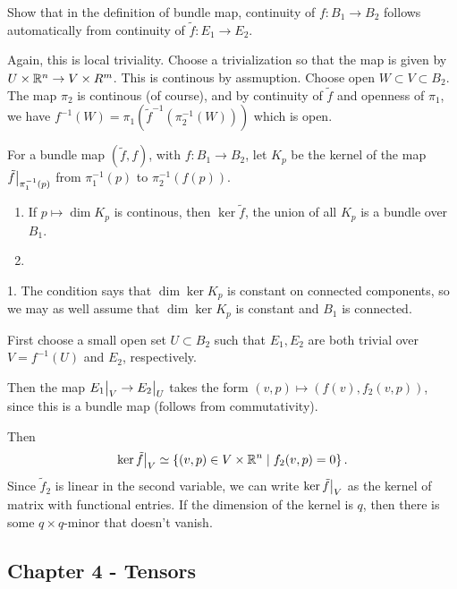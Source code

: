 \documentclass[11pt, english]{article}
\begin{document}
\begin{exc}
Show that in the definition of bundle map, continuity of $f:B_1 \to B_2$ follows automatically from continuity of $\widetilde f:E_1 \to E_2$. 
\end{exc}
\begin{sol}
Again, this is local triviality. Choose a trivialization so that the map is given by $U \times \mathbb{R}^n \to V \times R^m$. This is continous by assmuption. Choose open $W \subset V \subset B_2$. The map $\pi_2$ is continous (of course), and by continuity of $\widetilde f$ and openness of $\pi_1$, we have $f^{-1}(W)=\pi_1( \widetilde f ^{-1}(\pi_2^{-1}(W)))$ which is open.
\end{sol}

\begin{exc}
For a bundle map $(\tilde f, f)$, with $f:B_1 \to B_2$, let $K_p$ be the kernel of the map $\restr{\tilde f}{\pi_1^{-1}(p)}$ from $\pi_1^{-1}(p)$ to $\pi_2^{-1}(f(p))$.
\begin{enumerate}
\item If $p \mapsto \dim K_p$ is continous, then $\ker \tilde f$, the union of all $K_p$ is a bundle over $B_1$.
\item 
\end{enumerate}
\end{exc}
\begin{sol}
1. The condition says that $\dim \ker K_p$ is constant on connected components, so we may as well assume that $\dim \ker K_p$ is constant and $B_1$ is connected.

First choose a small open set $U \subset B_2$ such that $E_1,E_2$ are both trivial over $V=f^{-1}(U)$ and $E_2$, respectively.

Then the map $\restr{E_1}{V} \to \restr{E_2}{U}$ takes the form $(v,p) \mapsto (f(v),f_2(v,p))$, since this is a bundle map (follows from commutativity).

Then
$$
\restr{\ker \tilde f }{V} \simeq \left\{ (v,p) \in V \times \R^n \mid f_2(v,p)=0 \right\}.
$$
Since $\tilde f_2$ is linear in the second variable, we can write $\restr{\ker \tilde f }{V}$ as the kernel of matrix with functional entries. If the dimension of the kernel is $q$, then there is some $q \times q$-minor that doesn't vanish. 
\end{sol}

\subsection{Chapter 4 - Tensors}
\end{document}
